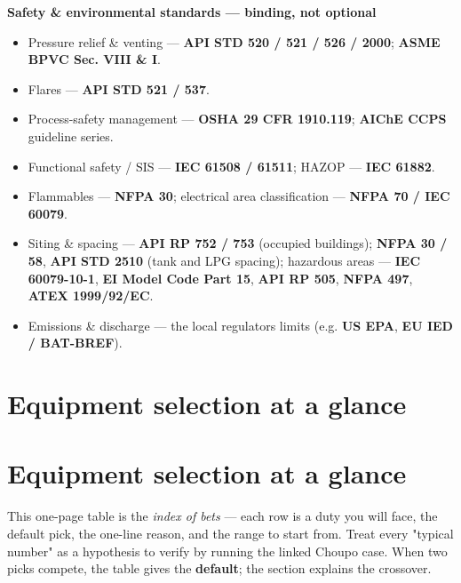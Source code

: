 \documentclass[11pt,a4paper]{article}
\providecommand{\tightlist}{\setlength{\itemsep}{0pt}\setlength{\parskip}{0pt}}
\begin{document}
\textbf{Safety \& environmental standards --- binding, not optional}

\begin{itemize}
\tightlist
\item
  Pressure relief \& venting --- \textbf{API STD 520 / 521 / 526 /
  2000}; \textbf{ASME BPVC Sec. VIII \& I}.
\item
  Flares --- \textbf{API STD 521 / 537}.
\item
  Process-safety management --- \textbf{OSHA 29 CFR 1910.119};
  \textbf{AIChE CCPS} guideline series.
\item
  Functional safety / SIS --- \textbf{IEC 61508 / 61511}; HAZOP ---
  \textbf{IEC 61882}.
\item
  Flammables --- \textbf{NFPA 30}; electrical area classification ---
  \textbf{NFPA 70 / IEC 60079}.
\item
  Siting \& spacing --- \textbf{API RP 752 / 753} (occupied buildings);
  \textbf{NFPA 30 / 58}, \textbf{API STD 2510} (tank and LPG spacing);
  hazardous areas --- \textbf{IEC 60079-10-1}, \textbf{EI Model Code Part
  15}, \textbf{API RP 505}, \textbf{NFPA 497}, \textbf{ATEX 1999/92/EC}.
\item
  Emissions \& discharge --- the local regulator\textquotesingle s
  limits (e.g. \textbf{US EPA}, \textbf{EU IED / BAT-BREF}).
\end{itemize}

\hypertarget{equipment-selection-at-a-glance}{%
\section{Equipment selection at a
glance}\label{equipment-selection-at-a-glance}}

\hypertarget{equipment-selection-at-a-glance-1}{%
\section{Equipment selection at a
glance}\label{equipment-selection-at-a-glance-1}}

This one-page table is the \emph{index of bets} --- each row is a duty
you will face, the default pick, the one-line reason, and the range to
start from. Treat every "typical number" as a hypothesis to verify by
running the linked Choupo case. When two picks compete, the table gives
the \textbf{default}; the section explains the crossover.
\end{document}
